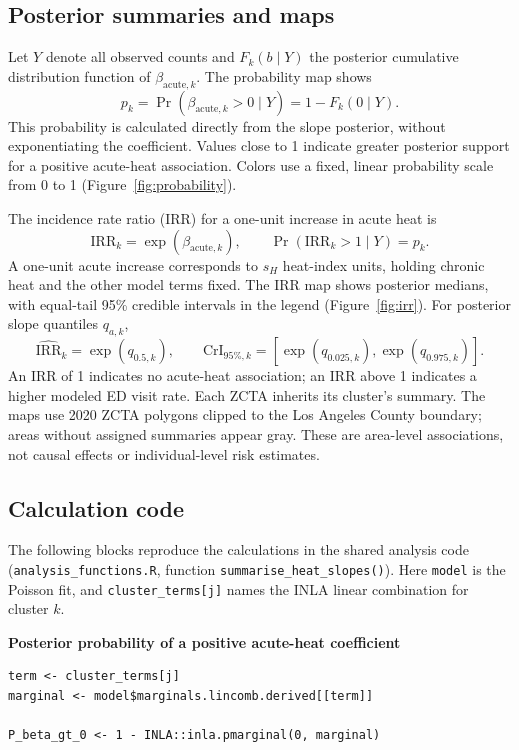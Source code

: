 \documentclass[11pt,letterpaper]{article}
\begin{document}
\subsection*{Posterior summaries and maps}
Let $Y$ denote all observed counts and $F_k(b\mid Y)$ the posterior cumulative
distribution function of $\beta_{\mathrm{acute},k}$. The probability map shows
\begin{equation}
p_k=\Pr(\beta_{\mathrm{acute},k}>0\mid Y)=1-F_k(0\mid Y).
\end{equation}
This probability is calculated directly from the slope posterior, without
exponentiating the coefficient. Values close to 1 indicate greater posterior
support for a positive acute-heat association. Colors use a fixed, linear
probability scale from 0 to 1 (Figure~\ref{fig:probability}).

The incidence rate ratio (IRR) for a one-unit increase in acute heat is
\begin{equation}
\mathrm{IRR}_k=\exp(\beta_{\mathrm{acute},k}),\qquad
\Pr(\mathrm{IRR}_k>1\mid Y)=p_k.
\end{equation}
A one-unit acute increase corresponds to $s_H$ heat-index units, holding
chronic heat and the other model terms fixed. The IRR map shows posterior
medians, with equal-tail 95\% credible intervals in the legend
(Figure~\ref{fig:irr}). For posterior slope quantiles $q_{a,k}$,
\begin{equation}
\widehat{\mathrm{IRR}}_k=\exp(q_{0.5,k}),\qquad
\mathrm{CrI}_{95\%,k}=[\exp(q_{0.025,k}),\exp(q_{0.975,k})].
\end{equation}
An IRR of 1 indicates no acute-heat association; an IRR above 1 indicates a
higher modeled ED visit rate. Each ZCTA inherits its cluster's summary.
The maps use 2020 ZCTA polygons clipped to the Los Angeles County boundary;
areas without assigned summaries appear gray. These are area-level
associations, not causal effects or individual-level risk estimates.

\subsection*{Calculation code}
The following blocks reproduce the calculations in the shared analysis code
(\texttt{analysis\_functions.R}, function \texttt{summarise\_heat\_slopes()}).
Here \texttt{model} is the Poisson fit, and \texttt{cluster\_terms[j]} names
the INLA linear combination for cluster $k$.

\textbf{Posterior probability of a positive acute-heat coefficient}
\begin{lstlisting}
term <- cluster_terms[j]
marginal <- model$marginals.lincomb.derived[[term]]

P_beta_gt_0 <- 1 - INLA::inla.pmarginal(0, marginal)
\end{lstlisting}
\end{document}

